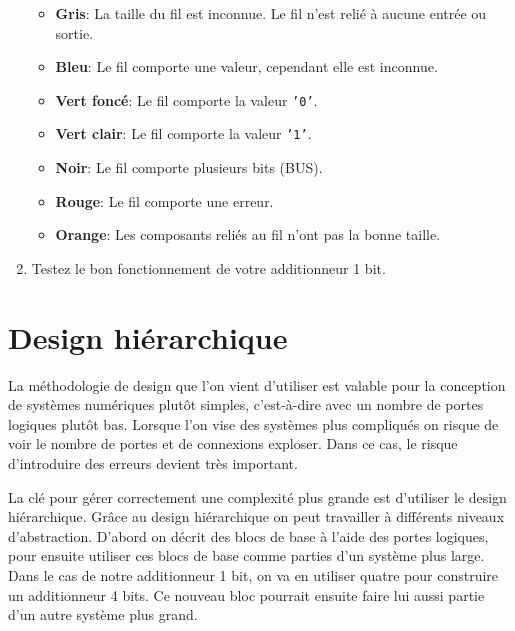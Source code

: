 \documentclass[nosolution]{exercice}
\begin{document}
\begin{enumerate}
\begin{itemize}
\item \textbf{Gris}: La taille du fil est inconnue. Le fil n'est relié à aucune entrée ou sortie.
\item \textbf{Bleu}: Le fil comporte une valeur, cependant elle est inconnue.
\item \textbf{Vert foncé}: Le fil comporte la valeur \texttt{'0'}.
\item \textbf{Vert clair}: Le fil comporte la valeur \texttt{'1'}.
\item \textbf{Noir}: Le fil comporte plusieurs bits (BUS).
\item \textbf{Rouge}: Le fil comporte une erreur.
\item \textbf{Orange}: Les composants reliés au fil n'ont pas la bonne taille.
\end{itemize}

\item Testez le bon fonctionnement de votre additionneur 1 bit.

\end{enumerate}

\section{Design hiérarchique}
La méthodologie de design que l'on vient d'utiliser est valable pour la conception de systèmes numériques plutôt
simples, c'est-à-dire avec un nombre de portes logiques plutôt bas. Lorsque l'on vise des systèmes plus compliqués on
risque de voir le nombre de portes et de connexions exploser. Dans ce cas, le risque d'introduire des erreurs devient
très important.

La clé pour gérer correctement une complexité plus grande est d'utiliser le design hiérarchique. Grâce au design
hiérarchique on peut travailler à différents niveaux d'abstraction. D'abord on décrit des blocs de base à l'aide des
portes logiques, pour ensuite utiliser ces blocs de base comme parties d'un système plus large. Dans le cas de notre
additionneur 1 bit, on va en utiliser quatre pour construire un additionneur 4 bits. Ce nouveau bloc pourrait ensuite
faire lui aussi partie d'un autre système plus grand.
\end{document}
